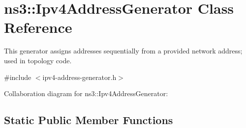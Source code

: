\hypertarget{classns3_1_1Ipv4AddressGenerator}{}\section{ns3\+:\+:Ipv4\+Address\+Generator Class Reference}
\label{classns3_1_1Ipv4AddressGenerator}


This generator assigns addresses sequentially from a provided network address; used in topology code.  




{\ttfamily \#include $<$ipv4-\/address-\/generator.\+h$>$}



Collaboration diagram for ns3\+:\+:Ipv4\+Address\+Generator\+:
\subsection*{Static Public Member Functions}
